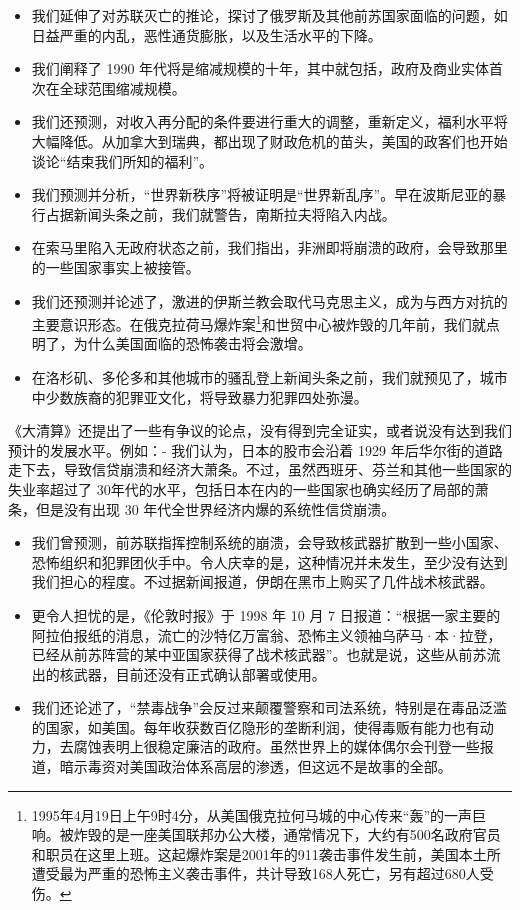 \begin{itemize}
    \item 我们延伸了对苏联灭亡的推论，探讨了俄罗斯及其他前苏国家面临的问题，如日益严重的内乱，恶性通货膨胀，以及生活水平的下降。
    \item 我们阐释了 1990 年代将是缩减规模的十年，其中就包括，政府及商业实体首次在全球范围缩减规模。
    \item 我们还预测，对收入再分配的条件要进行重大的调整，重新定义，福利水平将大幅降低。从加拿大到瑞典，都出现了财政危机的苗头，美国的政客们也开始谈论“结束我们所知的福利”。
    \item 我们预测并分析，“世界新秩序”将被证明是“世界新乱序”。早在波斯尼亚的暴行占据新闻头条之前，我们就警告，南斯拉夫将陷入内战。
    \item 在索马里陷入无政府状态之前，我们指出，非洲即将崩溃的政府，会导致那里的一些国家事实上被接管。
    \item 我们还预测并论述了，激进的伊斯兰教会取代马克思主义，成为与西方对抗的主要意识形态。在俄克拉荷马爆炸案\footnote{1995年4月19日上午9时4分，从美国俄克拉何马城的中心传来“轰”的一声巨响。被炸毁的是一座美国联邦办公大楼，通常情况下，大约有500名政府官员和职员在这里上班。这起爆炸案是2001年的911袭击事件发生前，美国本土所遭受最为严重的恐怖主义袭击事件，共计导致168人死亡，另有超过680人受伤。}和世贸中心被炸毁的几年前，我们就点明了，为什么美国面临的恐怖袭击将会激增。
    \item 在洛杉矶、多伦多和其他城市的骚乱登上新闻头条之前，我们就预见了，城市中少数族裔的犯罪亚文化，将导致暴力犯罪四处弥漫。
\end{itemize}

《大清算》还提出了一些有争议的论点，没有得到完全证实，或者说没有达到我们预计的发展水平。例如：- 我们认为，日本的股市会沿着 1929 年后华尔街的道路走下去，导致信贷崩溃和经济大萧条。不过，虽然西班牙、芬兰和其他一些国家的失业率超过了 30年代的水平，包括日本在内的一些国家也确实经历了局部的萧条，但是没有出现 30 年代全世界经济内爆的系统性信贷崩溃。

\begin{itemize}
    \item 我们曾预测，前苏联指挥控制系统的崩溃，会导致核武器扩散到一些小国家、恐怖组织和犯罪团伙手中。令人庆幸的是，这种情况并未发生，至少没有达到我们担心的程度。不过据新闻报道，伊朗在黑市上购买了几件战术核武器。
    \item 更令人担忧的是，《伦敦时报》于 1998 年 10 月 7 日报道：“根据一家主要的阿拉伯报纸的消息，流亡的沙特亿万富翁、恐怖主义领袖乌萨马·本·拉登，已经从前苏阵营的某中亚国家获得了战术核武器”。也就是说，这些从前苏流出的核武器，目前还没有正式确认部署或使用。
    \item 我们还论述了，“禁毒战争”会反过来颠覆警察和司法系统，特别是在毒品泛滥的国家，如美国。每年收获数百亿隐形的垄断利润，使得毒贩有能力也有动力，去腐蚀表明上很稳定廉洁的政府。虽然世界上的媒体偶尔会刊登一些报道，暗示毒资对美国政治体系高层的渗透，但这远不是故事的全部。
\end{itemize}


